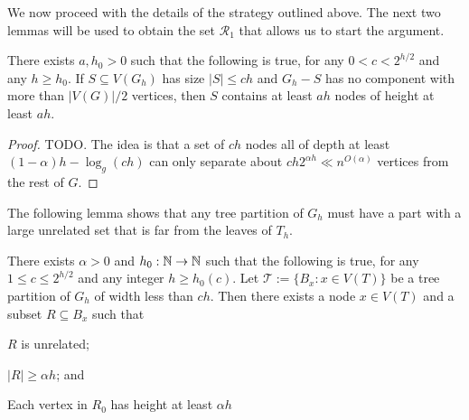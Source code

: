 \documentclass{patmorin}
\renewcommand{\le}{\leqslant}
\renewcommand{\ge}{\geqslant}
\begin{document}
We now proceed with the details of the strategy outlined above.  The next two lemmas will be used to obtain the set $\mathcal{R}_1$ that allows us to start the argument.

\begin{lem}\label{small_depth_separator}
  There exists $a,h_0 >0$ such that the following is true, for any $0 < c < 2^{h/2}$ and any $h\ge h_0$.
  If $S\subseteq V(G_h)$ has size $|S|\le ch$ and $G_h-S$ has no component with more than $|V(G)|/2$ vertices, then $S$ contains at least $ah$ nodes of height at least $ah$.
\end{lem}

\begin{proof}
  TODO. The idea is that a set of $ch$ nodes all of depth at least $(1-\alpha)h-\log_g(ch)$ can only separate about $ch2^{\alpha h}\ll n^{O(\alpha)}$ vertices from the rest of $G$.
\end{proof}


The following lemma shows that any tree partition of $G_h$ must have a part with a large unrelated set that is far from the leaves of $T_h$.

\begin{lem}\label{startup}
  There exists $\alpha >0$ and $h_0:\mathbb{N}\to\mathbb{N}$ such that the following is true, for any $1\le c\le 2^{h/2}$ and any integer $h\ge h_0(c)$.  Let $\mathcal{T}:=\{B_x:x\in V(T)\}$ be a tree partition of $G_h$ of width less than $ch$.  Then there exists a node $x\in V(T)$ and a subset $R\subseteq B_x$ such that
  \begin{compactenum}[(i)]
    \item $R$ is unrelated;
    \item $|R|\ge \alpha h$; and
    \item Each vertex in $R_0$ has height at least $\alpha h$
  \end{compactenum}
\end{lem}
\end{document}

